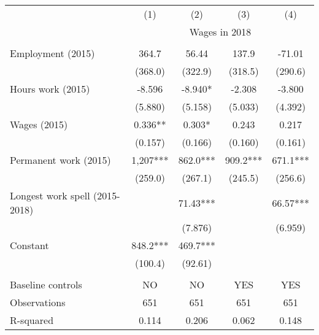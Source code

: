  \begin{tabular}{lcccc} \hline
 & (1) & (2) & (3) & (4) \\
  & \multicolumn{4}{c}{Wages in 2018}\\ \hline
 &  &  &  &  \\
Employment (2015)  & 364.7 & 56.44 & 137.9 & -71.01 \\
 & (368.0) & (322.9) & (318.5) & (290.6) \\
Hours work (2015)  & -8.596 & -8.940* & -2.308 & -3.800 \\
 & (5.880) & (5.158) & (5.033) & (4.392) \\
Wages (2015) & 0.336** & 0.303* & 0.243 & 0.217 \\
 & (0.157) & (0.166) & (0.160) & (0.161) \\
Permanent work (2015) & 1,207*** & 862.0*** & 909.2*** & 671.1*** \\
 & (259.0) & (267.1) & (245.5) & (256.6) \\
Longest work spell (2015-2018) &  & 71.43*** &  & 66.57*** \\
 &  & (7.876) &  & (6.959) \\
Constant & 848.2*** & 469.7*** &  &  \\
 & (100.4) & (92.61) &  &  \\
 &  &  &  &  \\
Baseline controls & NO & NO & YES & YES \\
Observations & 651 & 651 & 651 & 651 \\
 R-squared & 0.114 & 0.206 & 0.062 & 0.148 \\ \hline

\end{tabular}
 